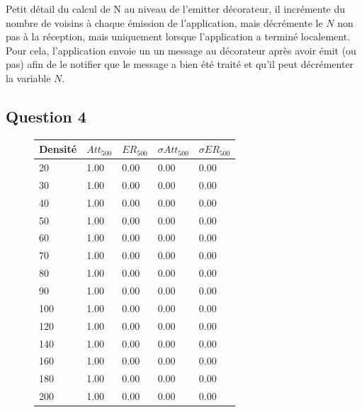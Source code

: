\documentclass[10pt]{report}
\begin{document}
Petit détail du calcul de N au niveau de l’emitter décorateur, il incrémente du nombre de voisins à chaque émission de l’application, mais décrémente le $N$ non pas à la réception, mais uniquement lorsque l’application a terminé localement. Pour cela, l’application envoie un un message au décorateur après avoir émit (ou pas) afin de le notifier que le message a bien été traité et qu’il peut décrémenter la variable $N$.\\

\subsection{Question 4}

\begin{figure}[H]
\begin{minipage}[b]{0.5\textwidth} \begin{flushleft}
\centering
\begin{tabular}{|l|l|l|l|l|} \hline
  	Densité & $Att_{500}$ & $ER_{500}$ & $\sigma Att_{500}$ & $\sigma ER_{500}$\\ \hline
	20 & 1.00 & 0.00 & 0.00 & 0.00 \\ \hline
  	30 & 1.00 & 0.00 & 0.00 & 0.00 \\ \hline
  	40 & 1.00 & 0.00 & 0.00 & 0.00 \\ \hline
  	50 & 1.00 & 0.00 & 0.00 & 0.00 \\ \hline
  	60 & 1.00 & 0.00 & 0.00 & 0.00 \\ \hline
  	70 & 1.00 & 0.00 & 0.00 & 0.00 \\ \hline
    80 & 1.00 & 0.00 & 0.00 & 0.00 \\ \hline
  	90 & 1.00 & 0.00 & 0.00 & 0.00 \\ \hline
  	100 & 1.00 & 0.00 & 0.00 & 0.00 \\ \hline
  	120 & 1.00 & 0.00 & 0.00 & 0.00 \\ \hline
  	140 & 1.00 & 0.00 & 0.00 & 0.00 \\ \hline
  	160 & 1.00 & 0.00 & 0.00 & 0.00 \\ \hline
  	180 & 1.00 & 0.00 & 0.00 & 0.00 \\ \hline
  	200 & 1.00 & 0.00 & 0.00 & 0.00 \\ \hline
\end{tabular}
\end{flushleft}\end{minipage}
%
\begin{minipage}{0.5\textwidth} \begin{flushright}

\end{flushright}
\end{minipage}
\end{figure}
\end{document}

